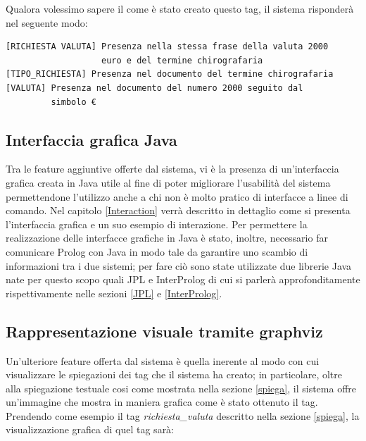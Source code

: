 Qualora volessimo sapere il come è stato creato questo tag, il sistema risponderà nel seguente modo:

\begin{verbatim}
[RICHIESTA VALUTA] Presenza nella stessa frase della valuta 2000
                   euro e del termine chirografaria
[TIPO_RICHIESTA] Presenza nel documento del termine chirografaria
[VALUTA] Presenza nel documento del numero 2000 seguito dal 
         simbolo €

\end{verbatim}
\subsection{Interfaccia grafica Java}
Tra le feature aggiuntive offerte dal sistema, vi è la presenza di un'interfaccia grafica creata in Java utile al fine di poter migliorare l'usabilità del sistema permettendone l'utilizzo anche a chi non è molto pratico di interfacce a linee di comando. Nel capitolo \ref{Interaction} verrà descritto in dettaglio come si presenta l'interfaccia grafica e un suo esempio di interazione. 
Per permettere la realizzazione delle interfacce grafiche in Java è stato, inoltre, necessario far comunicare Prolog con Java in modo tale da garantire uno scambio di informazioni tra i due sistemi; per fare ciò sono state utilizzate due librerie Java nate per questo scopo quali JPL e InterProlog di cui si parlerà approfonditamente rispettivamente nelle sezioni \ref{JPL} e \ref{InterProlog}.
\subsection{Rappresentazione visuale tramite graphviz}
\nocite{gansner2006drawing}
\nocite{wiki:Graphviz}
Un'ulteriore feature offerta dal sistema è quella inerente al modo con cui visualizzare le spiegazioni dei tag che il sistema ha creato; in particolare, oltre alla spiegazione testuale cosi come mostrata nella sezione \ref{spiega}, il sistema offre un'immagine che mostra in maniera grafica come è stato ottenuto il tag.
Prendendo come esempio il tag \emph{richiesta\_valuta} descritto nella sezione \ref{spiega}, la visualizzazione grafica di quel tag sarà:

